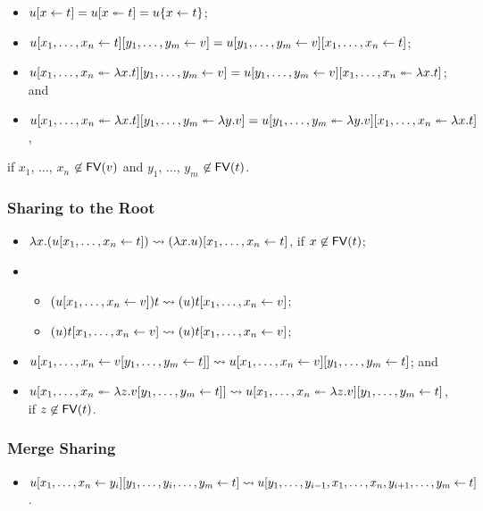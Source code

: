 \documentclass[10pt,a4paper]{article}
\theoremstyle{definition}
\theoremstyle{plain}
\theoremstyle{remark}
\begin{document}
\begin{itemize}
 \item $\terauxshare{u}{x}{t}=\terauxdist{u}{x}{t}=u\{x\leftarrow t\}$;
 \item $\tershare{\tershare{u}{x_1}{x_n}{t}}{y_1}{y_m}{v}=\tershare{\tershare{u}{y_1}{y_m}{v}}{x_1}{x_n}{t}$;
 \item $\tershare{\terdist{u}{x_1}{x_n}{x}{t}}{y_1}{y_m}{v}=\terdist{\tershare{u}{y_1}{y_m}{v}}{x_1}{x_n}{x}{t}$; and
 \item $\terdist{\terdist{u}{x_1}{x_n}{x}{t}}{y_1}{y_m}{y}{v}=\terdist{\terdist{u}{y_1}{y_m}{y}{v}}{x_1}{x_n}{x}{t}$,
\end{itemize}
if $x_1$, $\dots$, $x_n$ $\not\in\FV(v)$ and $y_1$, $\dots$, $y_m$ $\not\in\FV(t)$.

\subsubsection{Sharing to the Root}

\begin{itemize}
 \item $\lambda x.(\tershare{u}{x_1}{x_n}{t})\rightsquigarrow\tershare{(\lambda x.u)}{x_1}{x_n}{t}$, if $x\not\in\FV(t)$;
 \item \begin{itemize}
        \item $(\tershare{u}{x_1}{x_n}{v})t\rightsquigarrow\tershare{(u)t}{x_1}{x_n}{v}$;
        \item $(u)\tershare{t}{x_1}{x_n}{v}\rightsquigarrow\tershare{(u)t}{x_1}{x_n}{v}$;
       \end{itemize}
 \item $\tershare{u}{x_1}{x_n}{\tershare{v}{y_1}{y_m}{t}}\rightsquigarrow\tershare{\tershare{u}{x_1}{x_n}{v}}{y_1}{y_m}{t}$; and
 \item $\terdist{u}{x_1}{x_n}{z}{\tershare{v}{y_1}{y_m}{t}}\rightsquigarrow\tershare{\terdist{u}{x_1}{x_n}{z}{v}}{y_1}{y_m}{t}$, if $z\not\in\FV(t)$.
\end{itemize}

\subsubsection{Merge Sharing}

\begin{itemize}
 \item $\terauxshare{\tershare{u}{x_1}{x_n}{y_i}}{y_1,\dots,y_i,\dots,y_m}{t}\rightsquigarrow
	\terauxshare{u}{y_1,\dots,y_{i-1},x_1,\dots,x_n,y_{i+1},\dots,y_m}{t}$.
\end{itemize}
\end{document}
